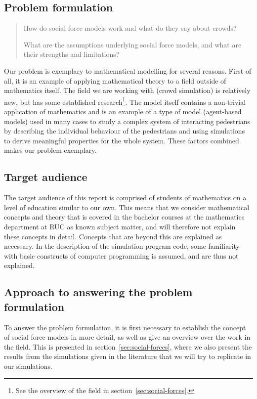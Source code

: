 \subsection{Problem formulation}
\begin{quote}
    How do social force models work and what do they say about crowds?

    What are the assumptions underlying social force models, and what are 
    their strengths and limitations?
\end{quote}

Our problem is exemplary to mathematical modelling for several reasons. First 
of all, it is an example of applying mathematical theory to a field outside of 
mathematics itself. The field we are working with (crowd simulation) is 
relatively new, but has some established research\footnote{See the overview of 
the field in section~\ref{sec:social-forces}.}. The model itself contains a 
non-trivial application of mathematics and is an example of a type of model 
(agent-based models) used in many cases to study a complex system of 
interacting pedestrians by describing the individual behaviour of the pedestrians and 
using simulations to derive meaningful properties for the whole system. These 
factors combined makes our problem exemplary.

\subsection{Target audience}
The target audience of this report is comprised of students of mathematics on 
a level of education similar to our own. This means that we consider 
mathematical concepts and theory that is covered in the bachelor courses at 
the mathematics department at RUC as known subject matter, and will therefore 
not explain these concepts in detail. Concepts that are beyond this are 
explained as necessary. In the description of the simulation program code, 
some familiarity with basic constructs of computer programming is assumed, and 
are thus not explained.

\subsection{Approach to answering the problem formulation}
To answer the problem formulation, it is first necessary to establish the 
concept of social force models in more detail, as well as give an overview 
over the work in the field. This is presented in 
section~\ref{sec:social-forces}, where we also present the results from the 
simulations given in the literature that we will try to replicate in our 
simulations.


